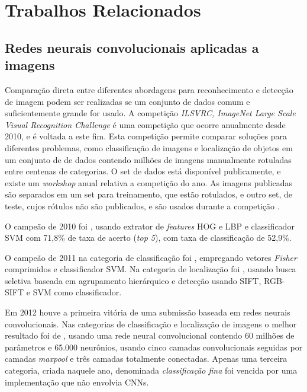 
\chapter{Trabalhos Relacionados}

\section{Redes neurais convolucionais aplicadas a imagens}

Comparação direta entre diferentes abordagens para reconhecimento e detecção de
imagem podem ser realizadas se um conjunto de dados comum e suficientemente
grande for usado. A competição \emph{ILSVRC, ImageNet Large Scale Visual
Recognition Challenge} é uma competição que ocorre anualmente desde 2010, e é
voltada a este fim. Esta competição permite comparar soluções 
para diferentes problemas, como classificação de imagens e localização de
objetos em um conjunto de
de dados contendo milhões de imagens manualmente rotuladas entre centenas de
categorias. O set de dados está disponível publicamente, e existe um
\emph{workshop} anual relativa a competição do ano. As imagens publicadas são
separados em um set para treinamento, que estão rotulados, e outro set, de
teste, cujos rótulos não são publicados, e são usados durante a competição
\cite{ILSVRC15}.

O campeão de 2010 foi \cite{lin2010imagenet}, usando extrator de
\emph{features} HOG e LBP e classificador SVM com 71,8\% de taxa de
acerto (\emph{top 5}), com taxa de classificação de 52,9\%.

O campeão de 2011 na categoria de classificação foi
\cite{perronnin2010large}, empregando vetores
\emph{Fisher} comprimidos e classificador SVM. Na categoria de localização foi
\cite{van2011segmentation}, usando busca seletiva baseada em agrupamento
hierárquico e detecção usando SIFT, RGB-SIFT e SVM como classificador.

Em 2012 houve a primeira vitória de uma submissão baseada em redes neurais
convolucionais. Nas categorias de classificação e localização de imagens o
melhor resultado foi
de \cite{krizhevsky2012imagenet}, usando uma rede neural convolucional contendo
60 milhões de parâmetros e 65.000 neurônios, usando cinco camadas
convolucionais seguidas por camadas \emph{maxpool} e três camadas totalmente
conectadas. Apenas uma terceira categoria, criada naquele ano, denominada
\emph{classificação fina} foi vencida por uma implementação que não envolvia
CNNs.

